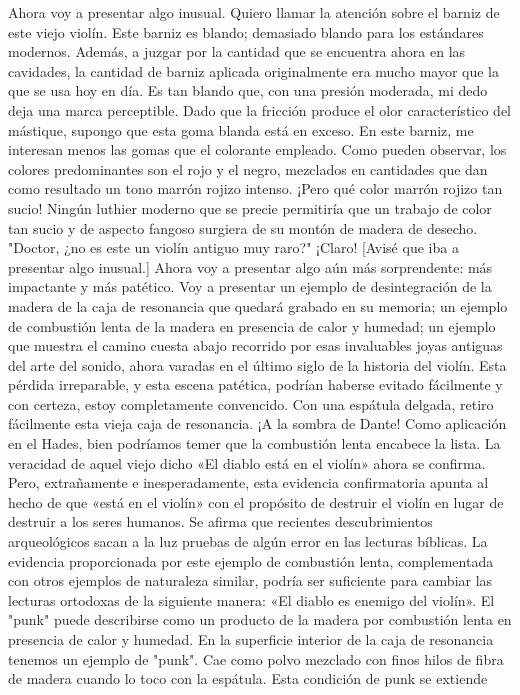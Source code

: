 Ahora voy a presentar algo inusual. Quiero llamar la atención sobre el barniz de este viejo violín. Este barniz es blando; demasiado blando para los estándares modernos. Además, a juzgar por la cantidad que se encuentra ahora en las cavidades, la cantidad de barniz aplicada originalmente era mucho mayor que la que se usa hoy en día. Es tan blando que, con una presión moderada, mi dedo deja una marca perceptible. Dado que la fricción produce el olor característico del mástique, supongo que esta goma blanda está en exceso. En este barniz, me interesan menos las gomas que el colorante empleado. Como pueden observar, los colores predominantes son el rojo y el negro, mezclados en cantidades que dan como resultado un tono marrón rojizo intenso.
¡Pero qué color marrón rojizo tan sucio! Ningún luthier moderno que se precie permitiría que un trabajo de color tan sucio y de aspecto fangoso surgiera de su montón de madera de desecho.
"Doctor, ¿no es este un violín antiguo muy raro?" ¡Claro!
[Avisé que iba a presentar algo inusual.]
Ahora voy a presentar algo aún más sorprendente: 
más impactante y más patético. Voy a presentar un ejemplo de desintegración de la madera de la caja de resonancia que quedará grabado en su memoria; un ejemplo de combustión lenta de la madera en presencia de calor y humedad; un ejemplo que muestra el camino cuesta abajo recorrido por esas invaluables joyas antiguas del arte del sonido, ahora varadas en el último siglo de la historia del violín. Esta pérdida irreparable, y esta escena patética, podrían haberse evitado fácilmente y con certeza, estoy completamente convencido. Con una espátula delgada, retiro fácilmente esta vieja caja de resonancia.
¡A la sombra de Dante!
Como aplicación en el Hades, bien podríamos temer que la combustión lenta encabece la lista. La veracidad de aquel viejo dicho «El diablo está en el violín» ahora se confirma. Pero, extrañamente e inesperadamente, esta evidencia confirmatoria apunta al hecho de que «está en el violín» con el propósito de destruir el violín en lugar de destruir a los seres humanos. Se afirma que recientes descubrimientos arqueológicos sacan a la luz pruebas de algún error en las lecturas bíblicas. La evidencia proporcionada por este ejemplo de combustión lenta, complementada con otros ejemplos de naturaleza similar, podría ser suficiente para cambiar las lecturas ortodoxas de la siguiente manera: «El diablo es enemigo del violín».
El "punk" puede describirse como un producto de la madera por combustión lenta en presencia de calor y humedad. En la superficie interior de la caja de resonancia tenemos un ejemplo de "punk". Cae como polvo mezclado con finos hilos de fibra de madera cuando lo toco con la espátula. Esta condición de punk se extiende

